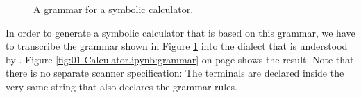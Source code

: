 \begin{figure}[!ht]

  \begin{center}    
  \end{center}
  \caption{A grammar for a symbolic calculator.}
  \label{fig:calculator.g}
\end{figure}

In order to generate a symbolic calculator that is based on this grammar, we have to transcribe the
grammar shown in Figure \ref{fig:calculator.g} into the  dialect that is understood by
.  Figure \ref{fig:01-Calculator.ipynb:grammar} on
page \pageref{fig:01-Calculator.ipynb:grammar} shows the result.  Note that there is no separate scanner
specification:  The terminals are declared inside the very same string that also declares the grammar
rules.

